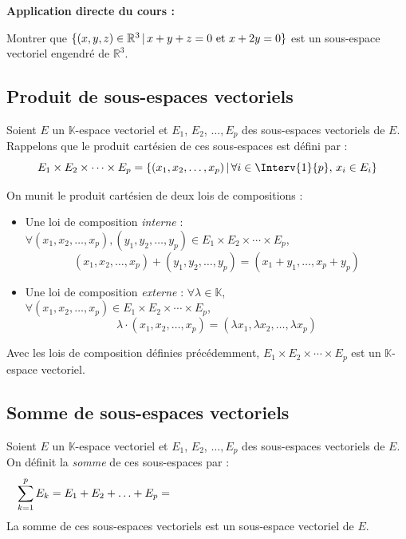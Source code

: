 \documentclass[french,11pt,twoside]{VcCours}
\newenvironment{ApplicationDirecte}{\textbf{Application directe du cours :}

}{}
\begin{document}
\begin{ApplicationDirecte} Montrer que $\lbrace (x,y,z)  \in \mathbb{R}^3 \, \vert \, x+y+z=0 \hbox{ et } x+2y=0\rbrace$ est un sous-espace vectoriel engendré de $\mathbb{R}^3$.
\end{ApplicationDirecte}

\subsection{Produit de sous-espaces vectoriels}

Soient $E$ un $\mathbb{K}$-espace vectoriel et $E_1$, $E_2$, $\ldots, E_p$ des sous-espaces vectoriels de $E$. Rappelons que le produit cartésien de ces sous-espaces est défini par :
$$ E_1 \times E_2 \times \cdots \times E_p = \left\lbrace (x_1, x_2, \ldots, x_p) \, \vert \, \forall i \in \Interv{1}{p}, \, x_i \in E_i \right\rbrace$$

On munit le produit cartésien de deux lois de compositions :

\begin{itemize}
\item Une loi de composition \emph{interne} : $\forall (x_1, x_2, \ldots, x_p), (y_1, y_2, \ldots, y_p) \in E_1 \times E_2 \times \cdots \times E_p$,
$$ (x_1, x_2, \ldots, x_p) + (y_1, y_2, \ldots, y_p) = (x_1+y_1, \ldots, x_p + y_p)$$
\item Une loi de composition \emph{externe} : $\forall \lambda \in \mathbb{K}$, $\forall (x_1, x_2, \ldots, x_p) \in E_1 \times E_2 \times \cdots \times E_p$,
$$ \lambda \cdot (x_1, x_2, \ldots, x_p) = (\lambda x_1, \lambda x_2, \ldots, \lambda x_p)$$
\end{itemize}

\begin{Proposition}{}
Avec les lois de composition définies précédemment, $E_1 \times E_2 \times \cdots \times E_p$ est un $\mathbb{K}$-espace vectoriel.
\end{Proposition}







\subsection{Somme de sous-espaces vectoriels}

\begin{TheoremeDefinition}{}
Soient $E$ un $\mathbb{K}$-espace vectoriel et $E_1$, $E_2$, $\ldots, E_p$ des sous-espaces vectoriels de $E$. On définit la \emph{somme} de ces sous-espaces par :
$$ \sum_{k=1}^p E_k = E_1 + E_2 + \ldots + E_p = \phantom{\left\lbrace \sum_{k=1}^p x_k \, \big{\vert} \, (x_1, x_2, \ldots, x_p) \in E_1 \times E_2 \times \cdots E_p \right\rbrace}$$
La somme de ces sous-espaces vectoriels est un sous-espace vectoriel de $E$.
\end{TheoremeDefinition}
\end{document}
